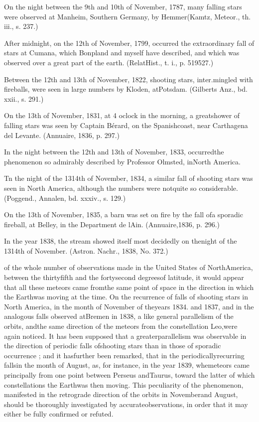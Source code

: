 { On the night between the 9th and 10th of November, 1787, many falling stars were observed at Manheim, Southern Germany, by Hemmer(Kamtz, Meteor., th. iii., s. 237.)
 
 After midnight, on the 12th of November, 1799, occurred the extraordinary fall of stars at Cumana, which Bonpland and myself have described, and which was observed over a great part of the earth. (RelatHist., t. i., p. 519527.)
 
 Between the 12th and 13th of November, 1822, shooting stars, inter.mingled with fireballs, were seen in large numbers by Kloden, atPotsdam. (Gilberts Anz., bd. xxii., s. 291.)
 
 On the 13th of November, 1831, at 4 oclock in the morning, a greatshower of falling stars was seen by Captain B\'{e}rard, on the Spanishcoast, near Carthagena del Levante. (Annuaire, 1836, p. 297.)
 
 In the night between the 12th and 13th of November, 1833, occurredthe phenomenon so admirably described by Professor Olmsted, inNorth America.
 
 Tn the night of the 1314th of November, 1834, a similar fall of shooting stars was seen in North America, although the numbers were notquite so considerable. (Poggend., Annalen, bd. xxxiv., s. 129.)
 
 On the 13th of November, 1835, a barn was set on fire by the fall ofa sporadic fireball, at Belley, in the Department de lAin. (Annuaire,1836, p. 296.)
 
 In the year 1838, the stream showed itself most decidedly on thenight of the 1314th of November. (Astron. Nachr., 1838, No. 372.)
 } of the whole number of observations made in the United States of NorthAmerica, between the thirtyfifth and the fortysecond degreesof latitude, it would appear that all these meteors came fromthe same point of space in the direction in which the Earthwas moving at the time. On the recurrence of falls of shooting stars in North America, in the month of November of theyears 1834. and 1837, and in the analogous falls observed atBremen in 1838, a like general parallelism of the orbits, andthe same direction of the meteors from the constellation Leo,were again noticed. It has been supposed that a greaterparallelism was observable in the direction of periodic falls ofshooting stars than in those of sporadic occurrence ; and it hasfurther been remarked, that in the periodicallyrecurring fallsin the month of August, as, for instance, in the year 1839, whemeteors came principally from one point between Perseus andTaurus, toward the latter of which constellations the Earthwas then moving. This peculiarity of the phenomenon, manifested in the retrograde direction of the orbits in Novemberand August, should be thoroughly investigated by accurateobservations, in order that it may either be fully confirmed or refuted.

